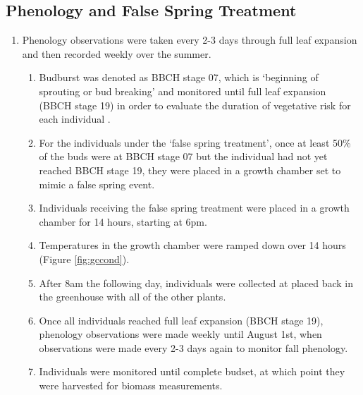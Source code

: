 \documentclass{article}\usepackage[]{graphicx}\usepackage[]{color}
\begin{document}
\subsection*{Phenology and False Spring Treatment}
\begin{enumerate}
\item Phenology observations were taken every 2-3 days through full leaf expansion and then recorded weekly over the summer.
  \begin{enumerate}
  \item Budburst was denoted as BBCH stage 07, which is `beginning of sprouting or bud breaking' and monitored until full leaf expansion (BBCH stage 19) in order to evaluate the duration of vegetative risk \citep{Chamberlain2019} for each individual \citep{Finn2007}.
  \item For the individuals under the `false spring treatment', once at least 50\% of the buds were at BBCH stage 07 but the individual had not yet reached BBCH stage 19, they were placed in a growth chamber set to mimic a false spring event.
  \item Individuals receiving the false spring treatment were placed in a growth chamber for 14 hours, starting at 6pm. 
  \item Temperatures in the growth chamber were ramped down over 14 hours (Figure \ref{fig:gccond}).
  \item After 8am the following day, individuals were collected at placed back in the greenhouse with all of the other plants. 
  \item Once all individuals reached full leaf expansion (BBCH stage 19), phenology observations were made weekly until August 1st, when observations were made every 2-3 days again to monitor fall phenology. 
  \item Individuals were monitored until complete budset, at which point they were harvested for biomass measurements.
  \end{enumerate}
\end{enumerate}
\end{document}
